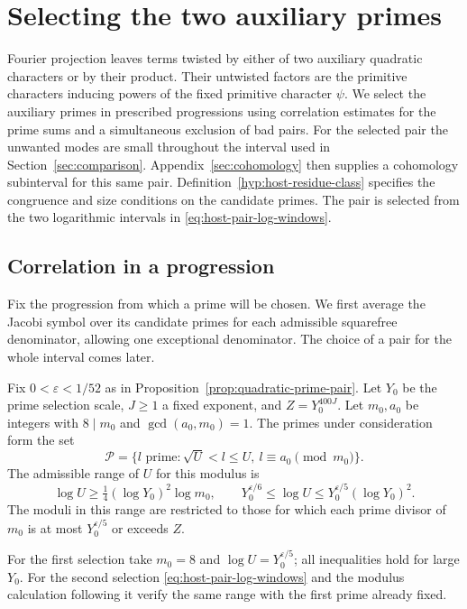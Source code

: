 \section{Selecting the two auxiliary primes}\label{sec:hosts}

Fourier projection leaves terms twisted by either of two auxiliary quadratic
characters or by their product. Their untwisted factors are the primitive characters
inducing powers of the fixed primitive character \(\psi\).
We select the auxiliary primes in prescribed progressions
using correlation estimates for the prime sums and a
simultaneous exclusion of bad pairs. For the selected pair
the unwanted modes are small throughout the interval used
in Section~\ref{sec:comparison}. Appendix~\ref{sec:cohomology}
then supplies a cohomology subinterval for this same pair. Definition~\ref{hyp:host-residue-class} specifies the congruence and size conditions on the candidate primes. The pair is selected from the two logarithmic intervals in \eqref{eq:host-pair-log-windows}.

\subsection{Correlation in a progression}

Fix the progression from which a prime will be chosen. We first average the Jacobi symbol over its candidate primes for each admissible squarefree denominator, allowing one exceptional denominator. The choice of a pair for the whole interval comes later.

\begin{paramdefinition}\label{hyp:host-residue-class}
Fix \(0<\varepsilon<1/52\) as in Proposition~\ref{prop:quadratic-prime-pair}. Let \(Y_0\) be the prime selection scale, \(J\ge1\) a fixed exponent,
and \(Z=Y_0^{400J}\). Let \(m_0,a_0\) be integers with \(8\mid m_0\) and \(\gcd(a_0,m_0)=1\). The primes under consideration form the set
\[
 \mathcal P=\{l\text{ prime}:\sqrt U<l\le U,\ l\equiv a_0\pmod{m_0}\}.
\] The admissible range of \(U\) for this modulus is
\[
 \log U\ge\tfrac14(\log Y_0)^2\log m_0,\qquad
 Y_0^{\varepsilon/6}\le\log U
       \le Y_0^{\varepsilon/5}(\log Y_0)^2 .
\]
The moduli in this range are restricted to those for which each prime divisor of \(m_0\) is at most
\(Y_0^{\varepsilon/5}\) or exceeds \(Z\).
\end{paramdefinition}
For the first selection take \(m_0=8\) and
\(\log U=Y_0^{\varepsilon/5}\); all inequalities hold for large
\(Y_0\). For the second selection \eqref{eq:host-pair-log-windows}
and the modulus calculation following it verify the same range
with the first prime already fixed.

